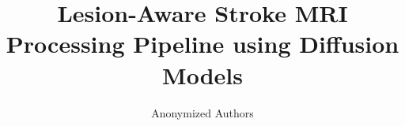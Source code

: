 \documentclass[runningheads]{llncs}
\begin{document}
%
\title{Lesion-Aware Stroke MRI Processing Pipeline using Diffusion Models}
%

\author{Anonymized Authors}  %
  
\end{document}

